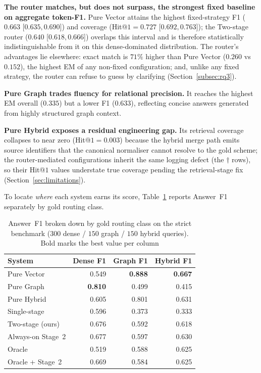 \noindent\textbf{The router matches, but does not surpass, the strongest
fixed baseline on aggregate token-F1.} Pure Vector attains the highest
fixed-strategy F1 ($0.663$ {\scriptsize[$0.635, 0.690$]}) and coverage
(Hit@$1=0.727$ {\scriptsize[$0.692, 0.763$]}); the Two-stage router
($0.640$ {\scriptsize[$0.618, 0.666$]}) overlaps this interval and is
therefore statistically indistinguishable from it on this dense-dominated
distribution. The router's advantages lie elsewhere: exact match is $71\%$
higher than Pure Vector ($0.260$ vs $0.152$), the highest EM of any
non-fixed configuration; and, unlike any fixed strategy, the router can
refuse to guess by clarifying (Section~\ref{subsec:rq3}).

\noindent\textbf{Pure Graph trades fluency for relational precision.} It
reaches the highest EM overall ($0.335$) but a lower F1 ($0.633$), reflecting
concise answers generated from highly structured graph context.

\noindent\textbf{Pure Hybrid exposes a residual engineering gap.} Its
retrieval coverage collapses to near zero (Hit@$1=0.003$) because the hybrid
merge path emits source identifiers that the canonical normaliser cannot
resolve to the gold scheme; the router-mediated configurations inherit the
same logging defect (the $\dag$ rows), so their Hit@$1$ values understate
true coverage pending the retrieval-stage fix
(Section~\ref{sec:limitations}).

To locate \emph{where} each system earns its score,
Table~\ref{tab:per_class_f1} reports Answer~F1 separately by gold routing
class.

\begin{table}[!htbp]
\centering
\caption{Answer~F1 broken down by gold routing class on the strict benchmark
($300$ dense / $150$ graph / $150$ hybrid queries). Bold marks the best value
per column}\label{tab:per_class_f1}
\begin{tabular}{lrrr}
\toprule
\textbf{System} & \textbf{Dense F1} & \textbf{Graph F1} & \textbf{Hybrid F1} \\
\midrule
Pure Vector      & 0.549 & \textbf{0.888} & \textbf{0.667} \\
Pure Graph       & \textbf{0.810} & 0.499 & 0.415 \\
Pure Hybrid      & 0.605 & 0.801 & 0.631 \\
Single-stage     & 0.596 & 0.373 & 0.333 \\
Two-stage (ours) & 0.676 & 0.592 & 0.618 \\
Always-on Stage~2 & 0.677 & 0.597 & 0.630 \\
\midrule
Oracle           & 0.519 & 0.588 & 0.625 \\
Oracle + Stage~2 & 0.669 & 0.584 & 0.625 \\
\bottomrule
\end{tabular}
\end{table}

